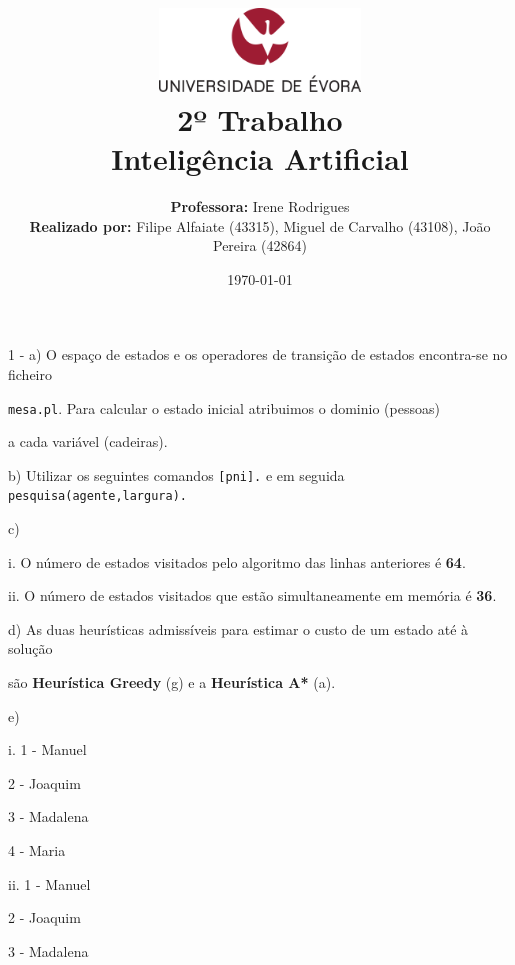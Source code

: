 \documentclass[11pt]{article}
\title
{
    \includegraphics[width=0.4\textwidth]{imgs/university.png}
    \\[0.1cm]
    \textbf{2º Trabalho} \\
    Inteligência Artificial
}
\author
{
    \textbf{Professora:} Irene Rodrigues \\
    \textbf{Realizado por:} Filipe Alfaiate (43315), Miguel de Carvalho (43108), João Pereira (42864) 
}
\date{\today}
\begin{document}
\maketitle

1 - a) O espaço de estados e os operadores de transição de estados encontra-se no ficheiro

\hspace{1,1cm}\verb|mesa.pl|. Para calcular o estado inicial atribuimos o dominio (pessoas)

\hspace{1,1cm}a cada variável (cadeiras).

\hspace{0,6cm}b) Utilizar os seguintes comandos \verb|[pni].| e em seguida 
\verb|pesquisa(agente,largura).|

\hspace{0,6cm}c)

\hspace{1cm}i. O número de estados visitados pelo algoritmo das linhas anteriores é \textbf{64}.

\hspace{1cm}ii. O número de estados visitados que estão simultaneamente em memória é \textbf{36}.

\hspace{0,6cm}d) As duas heurísticas admissíveis para estimar o custo de um estado até à solução

\hspace{1,1cm}são \textbf{Heurística Greedy} (g) e a \textbf{Heurística A*} (a).

\hspace{0,6cm}e)

\hspace{1cm}i. 1 - Manuel

\hspace{1,4cm}2 - Joaquim

\hspace{1,4cm}3 - Madalena

\hspace{1,4cm}4 - Maria
\newline

\hspace{1cm}ii. 1 - Manuel

\hspace{1,5cm}2 - Joaquim

\hspace{1,5cm}3 - Madalena
\end{document}
